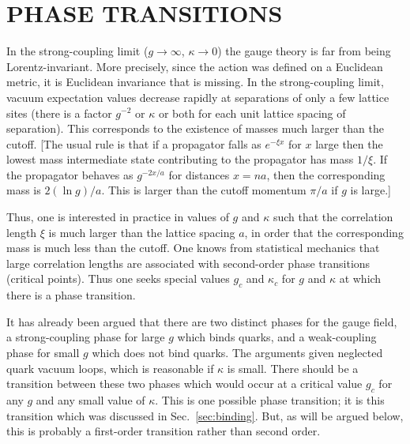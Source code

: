 \section{PHASE TRANSITIONS}\label{sec:phases}

In the strong-coupling limit ($g\to\infty$, $\kappa\to0$) the gauge
theory is far from being Lorentz-invariant.  More precisely, since the
action was defined on a Euclidean metric, it is Euclidean invariance that
is missing.  In the strong-coupling limit, vacuum expectation values
decrease rapidly at separations of only a few lattice sites (there is a
factor $g^{-2}$ or $\kappa$ or both for each unit lattice spacing of
separation).  This corresponds to the existence of masses much larger
than the cutoff.  [The usual rule is that if a propagator falls as
$e^{-\xi x}$ for $x$ large then the lowest mass intermediate state
contributing to the propagator has mass $1/\xi$.  If the propagator
behaves as $g^{-2x/a}$ for distances $x=na$, then the corresponding mass
is $2(\ln g)/a$.  This is larger than the cutoff momentum $\pi/a$ if $g$
is large.]

Thus, one is interested in practice in values of $g$ and $\kappa$ such
that the correlation length $\xi$ is much larger than the lattice
spacing $a$, in order that the corresponding mass is much less than the
cutoff.  One knows from statistical mechanics that large correlation
lengths are associated with second-order phase transitions (critical
points).  Thus one seeks special values $g_{c}$ and $\kappa_{c}$ for $g$
and $\kappa$ at which there is a phase transition.

It has already been argued that there are two distinct phases for the
gauge field, a strong-coupling phase for large $g$ which binds quarks,
and a weak-coupling phase for small $g$ which does not bind quarks.  The
arguments given neglected quark vacuum loops, which is reasonable if
$\kappa$ is small.  There should be a transition between these two
phases which would occur at a critical value $g_{c}$ for any $g$ and any
small value of $\kappa$.  This is one possible phase transition; it is
this transition which was discussed in Sec.~\ref{sec:binding}.  But, as
will be argued below, this is probably a first-order transition rather
than second order.


